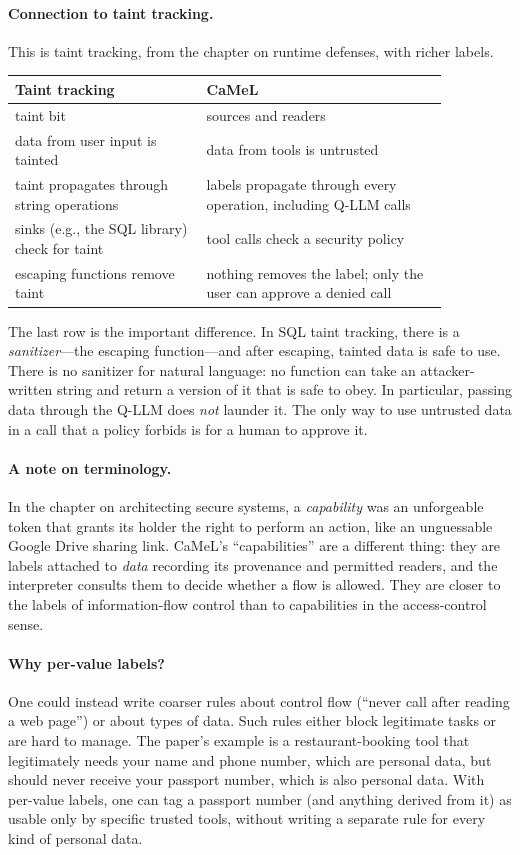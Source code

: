 \paragraph{Connection to taint tracking.}
This is taint tracking, from the chapter on runtime defenses, with richer
labels.
\begin{center}
\small
\begin{tabular}{p{0.38\linewidth}p{0.48\linewidth}}
  \textbf{Taint tracking} & \textbf{CaMeL} \\ \hline
  taint bit & sources and readers \\
  data from user input is tainted & data from tools is untrusted \\
  taint propagates through string operations & labels propagate
    through every operation, including Q-LLM calls \\
  sinks (e.g., the SQL library) check for taint & tool calls check a
    security policy \\
  escaping functions remove taint & nothing removes the label; only
    the user can approve a denied call \\
\end{tabular}
\end{center}
The last row is the important difference.
In SQL taint tracking, there is a \emph{sanitizer}---the escaping
function---and after escaping, tainted data is safe to use.
There is no sanitizer for natural language: no function can take an
attacker-written string and return a version of it that is safe to obey.
In particular, passing data through the Q-LLM does \emph{not} launder
it.
The only way to use untrusted data in a call that a policy forbids is
for a human to approve it.

\paragraph{A note on terminology.}
In the chapter on architecting secure systems, a \emph{capability} was
an unforgeable token that grants its holder the right to perform an
action, like an unguessable Google Drive sharing link.
CaMeL's ``capabilities'' are a different thing: they are labels attached
to \emph{data} recording its provenance and permitted readers, and the
interpreter consults them to decide whether a flow is allowed.
They are closer to the labels of information-flow control than to
capabilities in the access-control sense.

\paragraph{Why per-value labels?}
One could instead write coarser rules about control flow (``never call
 after reading a web page'') or about types of data.
Such rules either block legitimate tasks or are hard to manage.
The paper's example is a restaurant-booking tool that legitimately needs
your name and phone number, which are personal data, but should never
receive your passport number, which is also personal data.
With per-value labels, one can tag a passport number (and anything
derived from it) as usable only by specific trusted tools, without
writing a separate rule for every kind of personal data.

